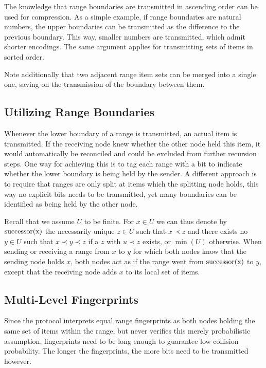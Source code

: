 The knowledge that range boundaries are transmitted in ascending order can be used for compression. As a simple example, if range boundaries are natural numbers, the upper boundaries can be transmitted as the difference to the previous boundary. This way, smaller numbers are transmitted, which admit shorter encodings. The same argument applies for transmitting sets of items in sorted order.

Note additionally that two adjacent range item sets can be merged into a single one, saving on the transmission of the boundary between them.

\subsection{Utilizing Range Boundaries}

Whenever the lower boundary of a range is transmitted, an actual item is transmitted. If the receiving node knew whether the other node held this item, it would automatically be reconciled and could be excluded from further recursion steps. One way for achieving this is to tag each range with a bit to indicate whether the lower boundary is being held by the sender. A different approach is to require that ranges are only split at items which the splitting node holds, this way no explicit bits needs to be transmitted, yet many boundaries can be identified as being held by the other node.

Recall that we assume $U$ to be finite. For $x \in U$ we can thus denote by $\operatorname{successor({x})}$ the necessarily unique $z \in U$ such that $x \prec z$ and there exists no $y \in U$ such that $x \prec y \prec z$ if a $z$ with $u \prec z$ exists, or $\min(U)$ otherwise. When sending or receiving a range from $x$ to $y$ for which both nodes know that the sending node holds $x$, both nodes act as if the range went from $\operatorname{successor({x})}$ to $y$, except that the receiving node adds $x$ to its local set of items.

\subsection{Multi-Level Fingerprints}

Since the protocol interprets equal range fingerprints as both nodes holding the same set of items within the range, but never verifies this merely probabilistic assumption, fingerprints need to be long enough to guarantee low collision probability. The longer the fingerprints, the more bits need to be transmitted however.

